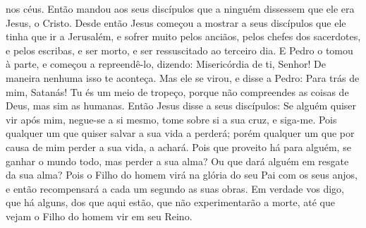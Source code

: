 {{} nos céus.
  Então mandou aos seus discípulos que a ninguém dissessem que ele era Jesus, o Cristo.
  Desde então Jesus começou a mostrar a seus discípulos que ele tinha que ir a Jerusalém, e sofrer muito pelos anciãos, pelos chefes dos sacerdotes, e pelos escribas, e ser morto, e ser ressuscitado ao terceiro dia.
  E Pedro o tomou à parte, e começou a repreendê-lo, dizendo: Misericórdia de ti, Senhor! De maneira nenhuma isso te aconteça.
  Mas ele se virou, e disse a Pedro: Para trás de mim, Satanás! Tu és um meio de tropeço, porque não compreendes as coisas de Deus, mas sim as humanas.
  Então Jesus disse a seus discípulos: Se alguém quiser vir após mim, negue-se a si mesmo, tome sobre si a sua cruz, e siga-me.
  Pois qualquer um que quiser salvar a sua vida a perderá; porém qualquer um que por causa de mim perder a sua vida,
{} a achará.
  Pois que proveito há para alguém, se ganhar o mundo todo, mas perder a sua alma? Ou que dará alguém em resgate da sua alma?
  Pois o Filho do homem virá na glória do seu Pai com os seus anjos, e então recompensará a cada um segundo as suas obras.
  Em verdade vos digo, que há alguns, dos que aqui estão, que não experimentarão a morte, até que vejam o Filho do homem vir em seu Reino.
\par }

